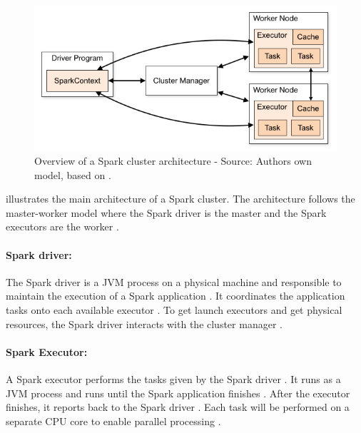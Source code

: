 \begin{figure}[h]%
\centering
\includegraphics[scale=0.5]{images/03_background/cluster_overview}%
\caption{Overview of a Spark cluster architecture - Source: Authors own model, based on \cite{Apache2020Spark}.}%
\label{fig:spark_cluster_overview}%
\end{figure}

 illustrates the main architecture of a Spark cluster. The architecture follows the master-worker model where the Spark driver is the master and the Spark executors are the worker \cite{Hien2018Spark}.

\paragraph{Spark driver:}
The Spark driver is a JVM process on a physical machine and responsible to maintain the execution of a Spark application \cite{Chambers2018Spark}. It coordinates the application tasks onto each available executor \cite{Hien2018Spark}. To get launch executors and get physical resources, the Spark driver interacts with the cluster manager \cite{Chambers2018Spark, Hien2018Spark}.


\paragraph{Spark Executor:}
A Spark executor performs the tasks given by the Spark driver \cite{Chambers2018Spark}. It runs as a JVM process and runs until the Spark application finishes \cite{Hien2018Spark}. After the executor finishes, it reports back to the Spark driver \cite{Chambers2018Spark}. Each task will be performed on a separate CPU core to enable parallel processing  \cite{Hien2018Spark}.


